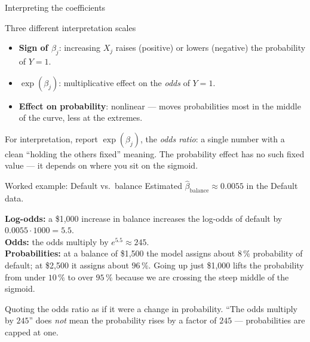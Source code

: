\documentclass[aspectratio=169,11pt]{beamer}
\begin{document}
\begin{frame}{Interpreting the coefficients}\label{frm:coefint}
  \begin{block}{Three different interpretation scales}
    \begin{itemize}
      \item \textbf{Sign of $\beta_j$}: increasing $X_j$ raises (positive)
            or lowers (negative) the probability of $Y = 1$.
      \item \textbf{$\exp(\beta_j)$}: multiplicative effect on the
            \emph{odds} of $Y = 1$.
      \item \textbf{Effect on probability}: nonlinear --- moves
            probabilities most in the middle of the curve, less at the
            extremes.
    \end{itemize}
  \end{block}
  \begin{takeaway}
    For interpretation, report $\exp(\beta_j)$, the \emph{odds ratio}: a
    single number with a clean ``holding the others fixed'' meaning. The
    probability effect has no such fixed value --- it depends on where you
    sit on the sigmoid.
  \end{takeaway}
\end{frame}

\begin{frame}{Worked example: Default vs.\ balance}
  Estimated $\hat\beta_{\text{balance}} \approx 0.0055$ in the Default
  data.
  \begin{numexample}
    \textbf{Log-odds:} a \$1{,}000 increase in balance increases the
    log-odds of default by $0.0055 \cdot 1000 = 5.5$.\\[3pt]
    \textbf{Odds:} the odds multiply by $e^{5.5} \approx 245$.\\[3pt]
    \textbf{Probabilities:} at a balance of \$1{,}500 the model
    assigns about $8\,\%$ probability of default; at \$2{,}500 it
    assigns about $96\,\%$. Going up just \$1{,}000 lifts the
    probability from under $10\,\%$ to over $95\,\%$ because we are
    crossing the steep middle of the sigmoid.
  \end{numexample}
  \begin{mistake}
    Quoting the odds ratio as if it were a change in probability. ``The odds
    multiply by $245$'' does \emph{not} mean the probability rises by a factor
    of $245$ --- probabilities are capped at one.
  \end{mistake}
\end{frame}
\end{document}
